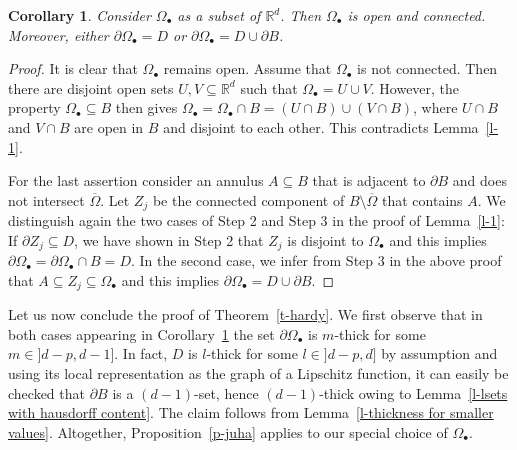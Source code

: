 \documentclass[10pt,leqno]{amsart}
\newtheorem{corollary}[theorem]{Corollary}
\theoremstyle{definition}
\numberwithin{equation}{section}
\begin{document}
\begin{corollary} \label{c-002HE}
 Consider $\Omega_\bullet$ as a subset of ${{\mathbb R}}^d$. Then $\Omega_\bullet$
 is open and connected. Moreover, either $\partial \Omega_\bullet = D$ or
 $\partial \Omega_\bullet = D \cup \partial B$.
\end{corollary}
\begin{proof}
 It is clear that $\Omega_\bullet$ remains open. Assume that $\Omega_\bullet$
 is not connected. Then there are disjoint open sets $U,V \subseteq {{\mathbb R}}^d$
 such that $\Omega_\bullet = U \cup V$. However, the property $\Omega_\bullet
 \subseteq B$ then gives $\Omega_\bullet = \Omega_\bullet \cap B = (U \cap B)
 \cup (V \cap B)$, where $U \cap B$ and $V \cap B$ are open in $B$ and disjoint
 to each other. This contradicts Lemma~\ref{l-1}.

 For the last assertion consider an annulus $A \subseteq B$ that is
 adjacent to $\partial B$ and does not intersect $\overline \Omega$. Let $Z_j$
 be the connected component of $B \setminus \overline{\Omega}$ that contains
 $A$. We distinguish again the two cases of Step 2 and Step 3 in the proof of
 Lemma~\ref{l-1}: If $\partial Z_j \subseteq D$, we have shown in Step 2
 that $Z_j$ is disjoint to $\Omega_\bullet$ and this implies $\partial
 \Omega_\bullet = \partial \Omega_\bullet \cap B = D$. In the second case, we
 infer from Step 3 in the above proof that $A \subseteq Z_j \subseteq
 \Omega_\bullet$ and this implies $\partial \Omega_\bullet = D \cup \partial B$.
 \end{proof}

Let us now conclude the proof of Theorem~\ref{t-hardy}. We first observe that in
both cases appearing in Corollary~\ref{c-002HE} the set $\partial
\Omega_\bullet$ is $m$-thick for some $m \in {]d-p,d-1]}$. In fact, $D$ is
$l$-thick for some $l \in {]d-p,d]}$ by assumption and using its local
representation as the graph of a Lipschitz function, it can easily be checked
that $\partial B$ is a $(d-1)$-set, hence $(d-1)$-thick owing to
Lemma~\ref{l-lsets with hausdorff content}. The claim follows from
Lemma~\ref{l-thickness for smaller values}. Altogether, Proposition~\ref{p-juha}
applies to our special choice of $\Omega_\bullet$. 
\end{document}
